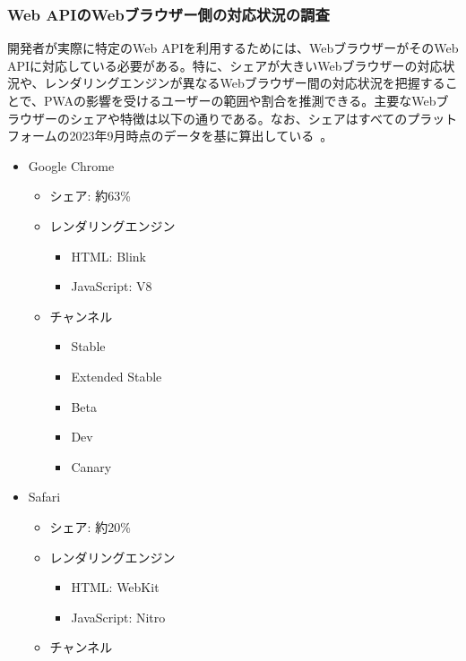 \subsubsection{Web APIのWebブラウザー側の対応状況の調査}
\label{subsubsection:Web APIのWebブラウザー側の対応状況の調査}
開発者が実際に特定のWeb APIを利用するためには、WebブラウザーがそのWeb APIに対応している必要がある。特に、シェアが大きいWebブラウザーの対応状況や、レンダリングエンジンが異なるWebブラウザー間の対応状況を把握することで、PWAの影響を受けるユーザーの範囲や割合を推測できる。主要なWebブラウザーのシェアや特徴は以下の通りである。なお、シェアはすべてのプラットフォームの2023年9月時点のデータを基に算出している~\cite{StatCounterBrowserMarketShare}。
\begin{itemize}
    \item Google Chrome
    \begin{itemize}
        \item シェア: 約63\%
        \item レンダリングエンジン
        \begin{itemize}
            \item HTML: Blink
            \item JavaScript: V8
        \end{itemize}
        \item チャンネル~\cite{GoogleChromeChannels}
        \begin{itemize}
            \item Stable
            \item Extended Stable
            \item Beta
            \item Dev
            \item Canary
        \end{itemize}
    \end{itemize}
    \item Safari
    \begin{itemize}
        \item シェア: 約20\%
        \item レンダリングエンジン
        \begin{itemize}
            \item HTML: WebKit
            \item JavaScript: Nitro
        \end{itemize}
        \item チャンネル~\cite{SafariChannels}
        \begin{itemize}

\end{itemize}
\end{itemize}
\end{itemize}
